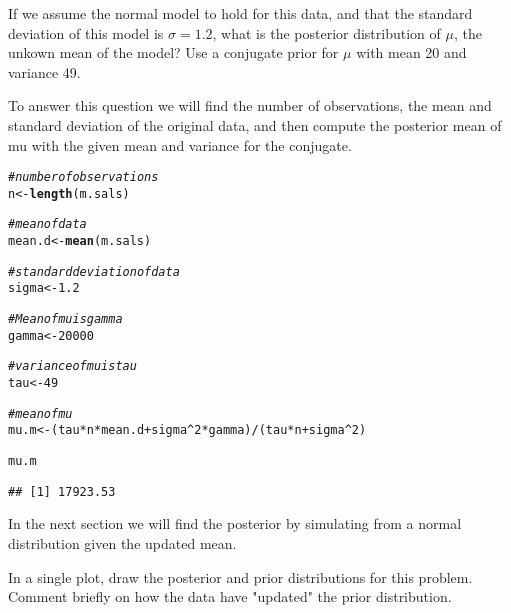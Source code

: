 \documentclass[12pt]{article}\usepackage[]{graphicx}\usepackage[]{color}
\makeatletter
\newcommand{\hlnum}[1]{\textcolor[rgb]{0.686,0.059,0.569}{#1}}%
\newcommand{\hlcom}[1]{\textcolor[rgb]{0.678,0.584,0.686}{\textit{#1}}}%
\newcommand{\hlopt}[1]{\textcolor[rgb]{0,0,0}{#1}}%
\newcommand{\hlstd}[1]{\textcolor[rgb]{0.345,0.345,0.345}{#1}}%
\newcommand{\hlkwb}[1]{\textcolor[rgb]{0.69,0.353,0.396}{#1}}%
\newcommand{\hlkwd}[1]{\textcolor[rgb]{0.737,0.353,0.396}{\textbf{#1}}}%
\newenvironment{kframe}{%
 \def\at@end@of@kframe{}%
 \ifinner\ifhmode%
  \def\at@end@of@kframe{\end{minipage}}%
  \begin{minipage}{\columnwidth}%
 \fi\fi%
 \def\FrameCommand##1{\hskip\@totalleftmargin \hskip-\fboxsep
 \colorbox{shadecolor}{##1}\hskip-\fboxsep
     \hskip-\linewidth \hskip-\@totalleftmargin \hskip\columnwidth}%
 \MakeFramed {\advance\hsize-\width
   \@totalleftmargin\z@ \linewidth\hsize
   \@setminipage}}%
 {\par\unskip\endMakeFramed%
 \at@end@of@kframe}
\newenvironment{knitrout}{}{} %
\newenvironment{problem}[2][Problem]{\begin{trivlist}
\item[\hskip \labelsep {\bfseries #1}\hskip \labelsep {\bfseries #2.}]}{\end{trivlist}}
\makeatother
\begin{document}
 \begin{problem}{b}
 If we assume the normal model to hold for this data, and that the standard deviation of this model is $\sigma=1.2$, what is the posterior distribution of $\mu$, the unkown mean of the model? Use a conjugate prior for $\mu$ with mean 20 and variance 49.
 \end{problem}
 
 To answer this question we will find the number of observations, the mean and standard deviation of the original data, and then compute the posterior mean of mu with the given mean and variance for the conjugate.
 
\begin{knitrout}
\color{fgcolor}\begin{kframe}
\begin{alltt}
\hlcom{#number of observations}
\hlstd{n} \hlkwb{<-} \hlkwd{length}\hlstd{(m.sals)}

\hlcom{# mean of data}
\hlstd{mean.d} \hlkwb{<-} \hlkwd{mean}\hlstd{(m.sals)}

\hlcom{#standard deviation of data}
\hlstd{sigma} \hlkwb{<-} \hlnum{1.2}

\hlcom{# Mean of mu is gamma}
\hlstd{gamma} \hlkwb{<-} \hlnum{20000}

\hlcom{# variance of mu is tau}
\hlstd{tau} \hlkwb{<-} \hlnum{49}

\hlcom{#mean of mu}
\hlstd{mu.m} \hlkwb{<-} \hlstd{(tau} \hlopt{*} \hlstd{n} \hlopt{*} \hlstd{mean.d} \hlopt{+} \hlstd{sigma}\hlopt{^}\hlnum{2} \hlopt{*} \hlstd{gamma)}\hlopt{/}\hlstd{(tau} \hlopt{*} \hlstd{n} \hlopt{+} \hlstd{sigma}\hlopt{^}\hlnum{2}\hlstd{)}

\hlstd{mu.m}
\end{alltt}
\begin{verbatim}
## [1] 17923.53
\end{verbatim}
\end{kframe}
\end{knitrout}
 In the next section we will find the posterior by simulating from a normal distribution given the updated mean.
 
 \begin{problem}{c}
 In a single plot, draw the posterior and prior distributions for this problem. Comment briefly on how the data have "updated" the prior distribution.
 \end{problem}
 
\end{document}
